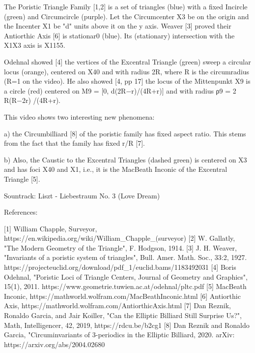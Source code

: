 The Poristic Triangle Family [1,2] is a set of triangles (blue) with a fixed Incircle (green) and Circumcircle (purple). Let the Circumcenter X3 be on the origin and the Incenter X1 be "d" units above it on the y axis.  Weaver [3] proved their Antiorthic Axis [6] is stationar0 (blue). Its (stationary) intersection with the X1X3 axis is X1155.

Odehnal showed [4] the vertices of the Excentral Triangle (green) sweep a circular locus (orange), centered on X40 and with radius 2R, where R is the circumradius (R=1 on the video). He also showed [4, pp 17] the locus of the Mittenpunkt X9 is a circle (red) centered on M9 = [0, d(2R−r)/(4R+r)] and with radius ρ9 = 2 R(R−2r) /(4R+r). 

This video shows two interesting new phenomena:

a) the Circumbilliard [8] of the poristic family has fixed aspect ratio. This stems from the fact that the family has fixed r/R [7].

b) Also, the Caustic to the Excentral Triangles (dashed green) is centered on X3 and has foci X40 and X1, i.e., it is the MacBeath Inconic of the Excentral Triangle [5].

Sountrack: Liszt - Liebestraum No. 3 (Love Dream)

References:

[1] William Chapple, Surveyor, https://en.wikipedia.org/wiki/William_Chapple_(surveyor)
[2] W. Gallatly, "The Modern Geometry of the Triangle", F. Hodgson, 1914.
[3] J. H. Weaver, "Invariants of a poristic system of triangles", Bull. Amer. Math. Soc., 33:2, 1927. https://projecteuclid.org/download/pdf_1/euclid.bams/1183492031
[4] Boris Odehnal, "Poristic Loci of Triangle Centers, Journal of Geometry and Graphics", 15(1), 2011. https://www.geometrie.tuwien.ac.at/odehnal/pltc.pdf
[5] MacBeath Inconic, https://mathworld.wolfram.com/MacBeathInconic.html
[6] Antiorthic Axis, https://mathworld.wolfram.com/AntiorthicAxis.html
[7] Dan Reznik, Ronaldo Garcia, and Jair Koiller, "Can the Elliptic Billiard Still Surprise Us?", Math, Intelligencer, 42, 2019, https://rdcu.be/b2cg1
[8] Dan Reznik and Ronaldo Garcia, "Circuminvariants of 3-periodics in the Elliptic Billiard, 2020. arXiv: https://arxiv.org/abs/2004.02680
